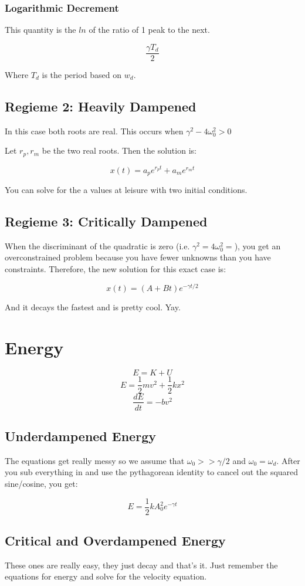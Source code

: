 \documentclass[a4paper,12pt]{report}
\begin{document}
\subsubsection{Logarithmic Decrement}
This quantity is the $ln$ of the ratio of 1 peak to the next.

$$\frac{\gamma T_d}{2}$$

Where $T_d$ is the period based on $w_d$.


\subsection{Regieme 2: Heavily Dampened}
In this case both roots are real. This occurs when $\gamma^2-4\omega_0^2 > 0$

Let $r_p, r_m$ be the two real roots. Then the solution is:

$$x(t) = a_pe^{r_pt} + a_me^{r_mt}$$

You can solve for the a values at leisure with two initial conditions.

\subsection{Regieme 3: Critically Dampened}
When the discriminant of the quadratic is zero (i.e. $\gamma^2 = 4\omega_0^2 = $), you
get an overconstrained problem because you have fewer unknowns than you have constraints.
Therefore, the new solution for this exact case is:

$$x(t) = (A + Bt)e^{-\gamma t/2}$$

And it decays the fastest and is pretty cool. Yay.

\section{Energy}
$$E = K + U$$
$$E = \frac{1}{2}mv^2 + \frac{1}{2}kx^2$$
$$\frac{dE}{dt} = -bv^2$$

\subsection{Underdampened Energy}
The equations get really messy so we assume that $\omega_0 >> \gamma/2$ and $\omega_0 = \omega_d$. After 
you sub everything in and use the pythagorean identity to cancel out the squared sine/cosine,
you get:

$$E = \frac{1}{2} kA_0^2e^{-\gamma t}$$

\subsection{Critical and Overdampened Energy}
These ones are really easy, they just decay and that's it. Just remember the equations for 
energy and solve for the velocity equation.
\end{document}
